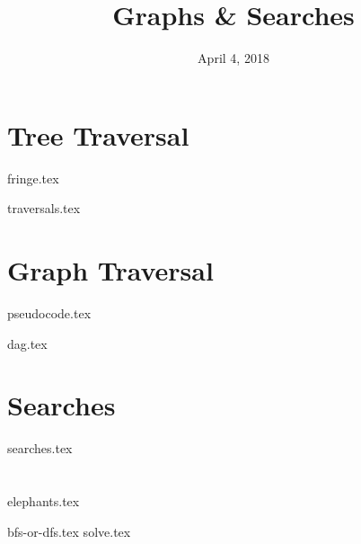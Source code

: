 \documentclass[11pt]{exam}
\title{Graphs \& Searches}
\date{April 4, 2018}
\begin{document}
\maketitle

\section{Tree Traversal}
{fringe.tex}
\begin{questions}
{traversals.tex}
\end{questions}

\section{Graph Traversal}
{pseudocode.tex}
\begin{questions}
{dag.tex}
\end{questions}

\clearpage

\section{Searches}
\begin{questions}
{searches.tex}
\end{questions}

\section{}
{elephants.tex}
\begin{questions}
{bfs-or-dfs.tex}
{solve.tex}
\end{questions}
\end{document}
